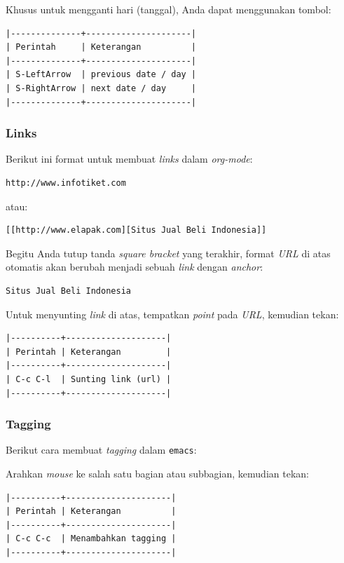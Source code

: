 \documentclass{article}
\begin{document}
Khusus untuk mengganti hari (tanggal), Anda dapat menggunakan tombol:

\begin{verbatim}
|--------------+---------------------|
| Perintah     | Keterangan          |
|--------------+---------------------|
| S-LeftArrow  | previous date / day |
| S-RightArrow | next date / day     |
|--------------+---------------------|
\end{verbatim}

\subsubsection{Links}
Berikut ini format untuk membuat \emph{links} dalam \emph{org-mode}:

\begin{verbatim}
http://www.infotiket.com
\end{verbatim}

atau:

\begin{verbatim}
[[http://www.elapak.com][Situs Jual Beli Indonesia]]
\end{verbatim}

Begitu Anda tutup tanda \emph{square bracket} yang terakhir, format \emph{URL}
di atas otomatis akan berubah menjadi sebuah \emph{link} dengan \emph{anchor}:

\begin{verbatim}
Situs Jual Beli Indonesia
\end{verbatim}

Untuk menyunting \emph{link} di atas, tempatkan \emph{point} pada \emph{URL},
kemudian tekan:

\begin{verbatim}
|----------+--------------------|
| Perintah | Keterangan         |
|----------+--------------------|
| C-c C-l  | Sunting link (url) |
|----------+--------------------|
\end{verbatim}

\subsubsection{Tagging}
Berikut cara membuat \emph{tagging} dalam \verb=emacs=:

Arahkan \emph{mouse} ke salah satu bagian atau subbagian, kemudian tekan:

\begin{verbatim}
|----------+---------------------|
| Perintah | Keterangan          |
|----------+---------------------|
| C-c C-c  | Menambahkan tagging |
|----------+---------------------|
\end{verbatim}
\end{document}
